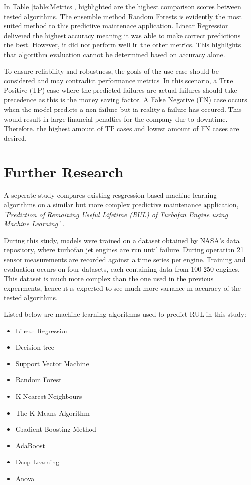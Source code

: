 In Table \ref{table:Metrics}, highlighted are the highest comparison scores between tested algorithms.
The ensemble method Random Forests is evidently the most suited method to this predictive maintenace application.
Linear Regression delivered the highest accuracy meaning it was able to make correct predictions the best. 
However, it did not perform well in the other metrics. This highlights that algorithm evaluation cannot be determined based on accuracy alone.

To ensure reliability and robustness, the goals of the use case should be considered and may contradict performance metrics.
In this scenario, a True Positive (TP) case where the predicted failures are actual failures should take precedence as this is the money saving factor. 
A False Negative (FN) case occurs when the model predicts a non-failure but in reality a failure has occured. This would result in large financial penalties for the company due to downtime.
Therefore, the highest amount of TP cases and lowest amount of FN cases are desired.

\section{Further Research}

A seperate study compares existing resgression based machine learning algorithms on a similar but more complex predictive maintenance application,
\textit{'Prediction of Remaining Useful Lifetime (RUL) of Turbofan Engine using Machine Learning'} \cite{RUL}.

During this study, models were trained on a dataset obtained by NASA's data repository, where turbofan jet engines are run until failure.
During operation 21 sensor measurements are recorded against a time series per engine. Training and evaluation occurs on four datasets, each containing data from 100-250 engines. 
This dataset is much more complex than the one used in the previous experiments,
hence it is expected to see much more variance in accuracy of the tested algorithms. 

Listed below are machine learning algorithms used to predict RUL in this study:
\begin{itemize}
    \item Linear Regression
    \item Decision tree
    \item Support Vector Machine
    \item Random Forest
    \item K-Nearest Neighbours
    \item The K Means Algorithm
    \item Gradient Boosting Method
    \item AdaBoost
    \item Deep Learning
    \item Anova 
\end{itemize}
\bigskip

